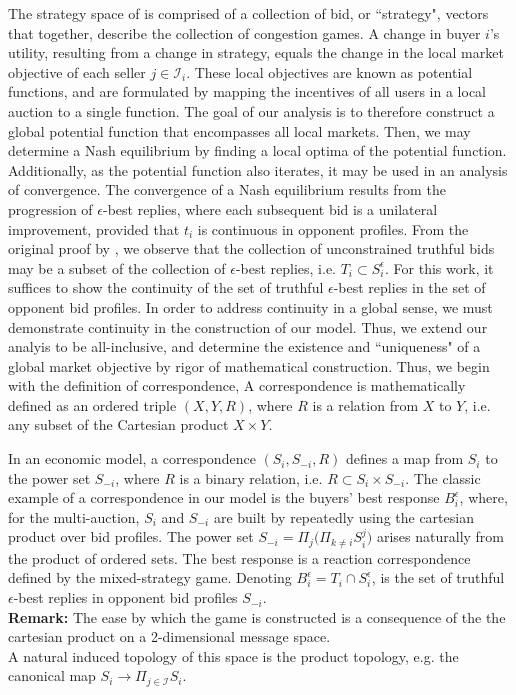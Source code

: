 \documentclass[sigconf, anonymous]{acmart}
\newcommand{\mcI}{\mathcal{I}}
\theoremstyle{definition}
\begin{document}
The strategy space of is comprised of a collection of bid, or ``strategy", vectors that
together, describe the collection of congestion games. A change in buyer $i$'s
utility, resulting from a change in strategy, equals the change in
the local market objective of each seller $j\in\mcI_i$. These local objectives are known as potential functions, and are
formulated by mapping the incentives of all users in a local auction to a
single function. The goal of our analysis is to therefore construct a global potential function that encompasses
all local markets. Then, we may determine a Nash equilibrium by finding a local
optima of the potential function. Additionally, as the potential function also
iterates, it may be used in an analysis of convergence. The
convergence of a Nash equilibrium results from the progression of
$\epsilon$-best replies, where each subsequent bid is a unilateral
improvement, provided that $t_i$ is continuous in opponent profiles.
From the original proof by \cite{lazar}, we observe that the collection of
unconstrained truthful bids may be a subset
of the collection of $\epsilon$-best replies, i.e. $T_i\subset S_i^\epsilon$.         
For this work, it suffices to show the continuity of the set of truthful
$\epsilon$-best replies in the set of opponent bid profiles.
In order to address continuity in a global sense, we must demonstrate
continuity in the construction of our model.
Thus, we extend our analyis to be all-inclusive, %
and determine the
existence and ``uniqueness" of a global market objective by rigor of mathematical construction. Thus, we begin with the definition of
correspondence,
{
A correspondence is mathematically defined as an ordered triple $(X,Y,R)$, where $R$ is a relation from $X$ to
$Y$, i.e. any subset of the Cartesian product $X\times Y$.
}

In an economic model, a correspondence $(S_i,S_{-i},R)$ defines a map from $S_i$
to the power set $S_{-i}$, where $R$ is a binary relation, i.e. $R \subset
S_i\times S_{-i}$. The classic
example of a correspondence in our model is the buyers' best response
$B_i^\epsilon$, where, for the multi-auction,
$S_i$ and $S_{-i}$ are built by repeatedly using the
cartesian product over bid profiles. The power set 
$S_{-i} =\Pi_j \big(\Pi_{k\ne i} S_i^j)$ arises naturally from the
product of ordered sets. 
The best response is a reaction correspondence
defined by the mixed-strategy game. Denoting  $B_i^\epsilon = T_i\cap
S_i^\epsilon$, is the set of truthful $\epsilon$-best replies in opponent bid
profiles $S_{-i}$. \\
\textbf{Remark:} 
The ease by which the game is constructed is a consequence of the the cartesian
product on a 2-dimensional message space. \\
A natural induced topology of this space is the product
topology, e.g. the canonical map $S_i \rightarrow \Pi_{j\in\mcI} S_i$.
\end{document}
